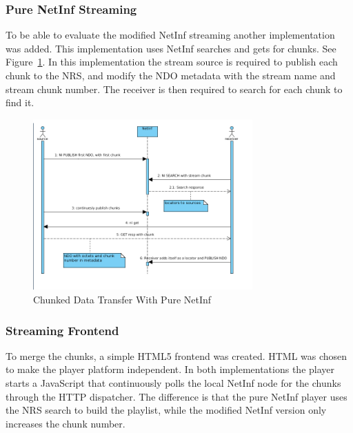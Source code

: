 \subsubsection{Pure NetInf Streaming}
To be able to evaluate the modified NetInf streaming another implementation was added. This implementation uses NetInf searches and gets for chunks. See Figure~\ref{fig:stream-seq-pure}. In this implementation the stream source is required to publish each chunk to the NRS, and modify the NDO metadata with the stream name and stream chunk number. The receiver is then required to search for each chunk to find it. 

\begin{figure}[h!]
	\centering
		\includegraphics[width=0.75\textwidth]{./img/sequence_diagram_pure_streaming.png}
    	\caption{Chunked Data Transfer With Pure NetInf}
	\label{fig:stream-seq-pure}
\end{figure}

\subsubsection{Streaming Frontend}
To merge the chunks, a simple HTML5 frontend was created. HTML was chosen to make the player platform independent.
In both implementations the player starts a JavaScript that continuously polls the local NetInf node for the chunks through the HTTP dispatcher.
The difference is that the pure NetInf player uses the NRS search to build the playlist, while the modified NetInf version only increases the chunk number.
